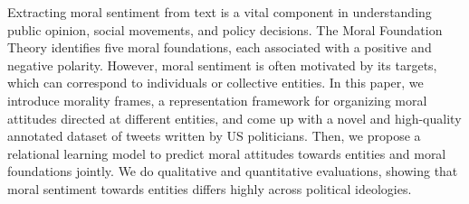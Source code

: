 Extracting moral sentiment from text is a vital component in understanding public opinion, social movements, and policy decisions. The Moral Foundation Theory identifies five moral foundations, each associated with a positive and negative polarity. However, moral sentiment is often motivated by its targets, which can correspond to individuals or collective entities. In this paper, we introduce morality frames, a representation framework for organizing moral attitudes directed at different entities, and come up with a novel and high-quality annotated dataset of tweets written by US politicians. Then, we propose a relational learning model to predict moral attitudes towards entities and moral foundations jointly. We do qualitative and quantitative evaluations, showing that moral sentiment towards entities differs highly across political ideologies.
